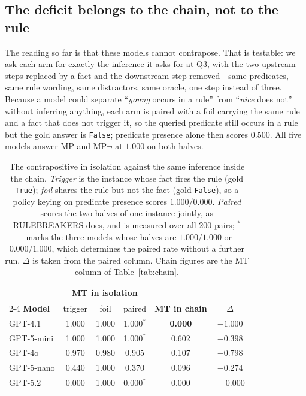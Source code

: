 \documentclass{article}
\begin{document}
\subsection{The deficit belongs to the chain, not to the rule}
The reading so
far is that these models cannot contrapose. That is testable: we ask each arm
for exactly the inference it asks for at Q3, with the two upstream steps
replaced by a fact and the downstream step removed---same predicates, same rule
wording, same distractors, same oracle, one step instead of three. Because a
model could separate ``\emph{young} occurs in a rule'' from ``\emph{nice} does
not'' without inferring anything, each arm is paired with a foil carrying the
same rule and a fact that does not trigger it, so the queried predicate still
occurs in a rule but the gold answer is \texttt{False}; predicate presence alone
then scores $0.500$. All five models answer MP and MP$\neg$ at $1.000$ on both
halves.

\begin{table}[h]
\centering\small
\caption{The contrapositive in isolation against the same inference inside the
chain. \emph{Trigger} is the instance whose fact fires the rule (gold
\texttt{True}); \emph{foil} shares the rule but not the fact (gold
\texttt{False}), so a policy keying on predicate presence scores $1.000/0.000$.
\emph{Paired} scores the two halves of one instance jointly, as
\textsc{RULEBREAKERS} does, and is measured over all $200$ pairs; $^{\ast}$~marks
the three models whose halves are $1.000/1.000$ or $0.000/1.000$, which
determines the paired rate without a further run. $\Delta$ is taken from the
paired column. Chain figures are the MT column of Table~\ref{tab:chain}.}
\label{tab:isolated}
\begin{tabular}{lccccc}
\toprule
& \multicolumn{3}{c}{\textbf{MT in isolation}} & & \\
\cmidrule(lr){2-4}
\textbf{Model} & trigger & foil & paired & \textbf{MT in chain} & $\Delta$ \\
\midrule
GPT-4.1     & 1.000 & 1.000 & 1.000$^{\ast}$ & \textbf{0.000} & $\mathbf{-1.000}$ \\
GPT-5-mini  & 1.000 & 1.000 & 1.000$^{\ast}$ & 0.602 & $-0.398$ \\
GPT-4o      & 0.970 & 0.980 & 0.905 & 0.107 & $-0.798$ \\
GPT-5-nano  & 0.440 & 1.000 & 0.370 & 0.096 & $-0.274$ \\
GPT-5.2     & 0.000 & 1.000 & 0.000$^{\ast}$ & 0.000 & $\phantom{-}0.000$ \\
\bottomrule
\end{tabular}
\end{table}
\end{document}
